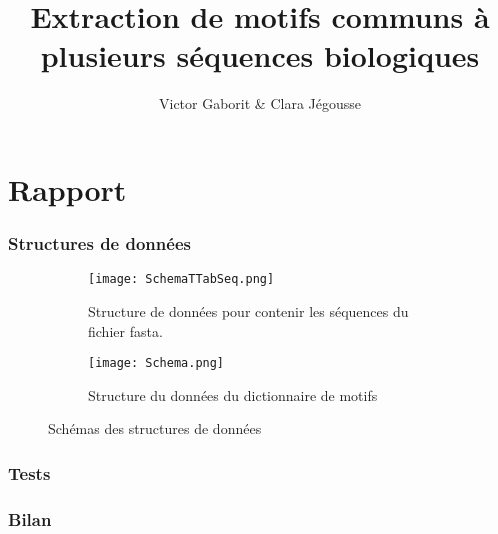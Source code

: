 \documentclass[11pt, oneside]{article}
\title{Extraction de motifs communs à plusieurs séquences biologiques}
\author{Victor Gaborit \& Clara Jégousse}
\date{}
\begin{document}

\maketitle

\setcounter{tocdepth}{3}
\tableofcontents
\clearpage

\part*{Rapport}

\section{Structures de données} 

\begin{figure}[h!]
\begin{subfigure}{\textwidth}
  \centering
  \texttt{[image: SchemaTTabSeq.png]}
  \caption{Structure de données pour contenir les séquences du fichier fasta.}
  \label{fig:sfig1}
\end{subfigure}%

\begin{subfigure}{\textwidth}
  \centering
  \texttt{[image: Schema.png]}
  \caption{Structure du données du dictionnaire de motifs}
  \label{fig:sfig3}
\end{subfigure}
\caption{Schémas des structures de données}
\label{fig:Superposition_ligands_4kzk_2xom_4asl_4f8l}
\end{figure}
\newpage

\section{Tests}


\section{Bilan}

\end{document}
